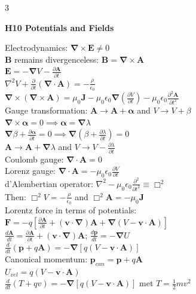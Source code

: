 \documentclass[a4paper,twoside]{article}
\newcommand{\secblock}[1]{%
\par\vspace{3pt}%
\noindent\colorbox{hdrcol}{\parbox[c][1.1em][c]{0.98\linewidth}{\color{white}\bfseries\small #1}}\par
\vspace{2pt}%
}
\begin{document}
\begin{multicols*}{3}
\secblock{H10 Potentials and Fields}
Electrodynamics: \(\bm \nabla \times \bm E \neq 0\)\\
\(\bm B\) remains divergenceless: \(\bm B = \bm \nabla \times \bm A\)\\
\(\bm E = - \bm \nabla V - \frac{\partial \bm A}{\partial t}\) \\
\(\nabla^2 V + \frac{\partial }{\partial t}(\bm \nabla \cdot \bm A) = -\frac{\rho}{\epsilon_0}\)\\
\(\bm \nabla \times (\bm \nabla \times \bm A)= \mu_0 \bm J - \mu_0 \epsilon_0 \bm \nabla \left(\frac{\partial V }{\partial t}\right) - \mu_0 \epsilon_0 \frac{\partial^2 \bm A}{\partial t^2}\)\\
Gauge transformation: \(\bm A \to \bm A + \bm \alpha\) and \(V \to V + \beta\) \\
\(\bm \nabla \times \bm\alpha = 0 \implies \bm \alpha = \bm \nabla \lambda\)\\
\(\bm \nabla \beta + \frac{\partial \bm \alpha}{\partial t} = 0 \implies\bm \nabla (\beta + \frac{\partial \lambda}{\partial t})=0\)\\
\(\bm A \to \bm A + \bm \nabla \lambda\) and \(V \to V - \frac{\partial \lambda}{\partial t}\)\\
Coulomb gauge: \(\bm \nabla \cdot \bm A = 0\)\\
Lorenz gauge: \(\bm \nabla \cdot \bm A = -\mu_0 \epsilon_0 \frac{\partial V}{\partial t} \)\\
d'Alembertian operator:  \(\nabla^2 -\mu_0 \epsilon_0 \frac{\partial^2}{\partial t^2} \equiv \Box^2\)\\
Then: \(\Box^2 V = -\frac{\rho}{\epsilon_0}\) and \(\Box^2 \bm A = -\mu_0 \bm J\)\\
Lorentz force in terms of potentials:\\
\(\bm F = -q[\frac{\partial \bm A}{\partial t} + (\bm v \cdot \bm \nabla) \bm A + \bm \nabla (V-\bm v \cdot \bm A)]\)\\
\( \frac{d \bm A}{dt} = \frac{\partial \bm A}{\partial t} + (\bm v \cdot \bm \nabla) \bm A \); \(\frac{d\bm p}{dt} = - \bm \nabla U\)\\
\(\frac{d}{dt}(\bm p + q \bm A) = - \bm \nabla [q(V-\bm v \cdot \bm A)]\)\\
Canonical momentum: \(\bm p_{can} = \bm p + q \bm A\)\\
\(U_{vel} = q(V-\bm v \cdot \bm A)\)\\
\(\frac{d}{dt} (T + qv) = - \bm \nabla [q(V-\bm v \cdot \bm A)]\) met \(T = \frac{1}{2}mv^2\)\\

\end{multicols*}
\end{document}
